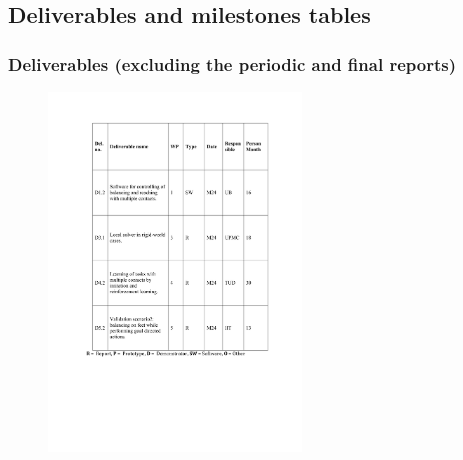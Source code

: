 \documentclass[12pt,a4paper,twoside]{article}
\begin{document}





























\subsection{Deliverables and milestones tables}

\subsubsection{Deliverables (excluding the periodic and final reports)}

\begin{figure}[ht!]
\centering
\includegraphics[width=0.6\textwidth]{./images/deliverables.pdf}
\end{figure}
\end{document}
